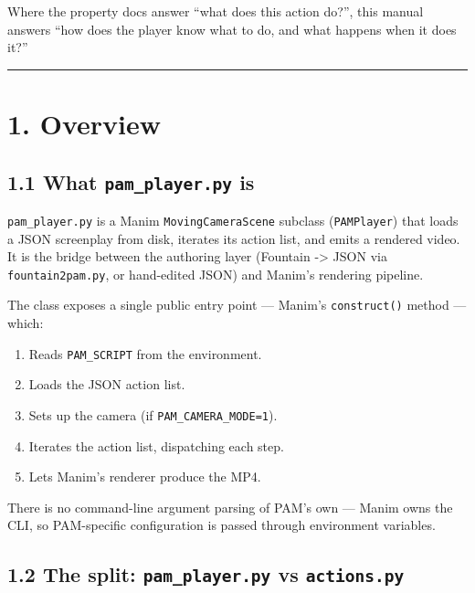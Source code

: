 \documentclass[
  12pt,
  letterpaper,
]{book}
\providecommand{\tightlist}{%
  \setlength{\itemsep}{0pt}\setlength{\parskip}{0pt}}
\begin{document}
Where the property docs answer ``what does this action do?'', this
manual answers ``how does the player know what to do, and what happens
when it does it?''

\begin{center}\rule{0.5\linewidth}{0.5pt}\end{center}

\section{1. Overview}\label{overview}

\subsection{\texorpdfstring{1.1 What \texttt{pam\_player.py}
is}{1.1 What pam\_player.py is}}\label{what-pam_player.py-is}

\texttt{pam\_player.py} is a Manim \texttt{MovingCameraScene} subclass
(\texttt{PAMPlayer}) that loads a JSON screenplay from disk, iterates
its action list, and emits a rendered video. It is the bridge between
the authoring layer (Fountain -\textgreater{} JSON via
\texttt{fountain2pam.py}, or hand-edited JSON) and Manim's rendering
pipeline.

The class exposes a single public entry point --- Manim's
\texttt{construct()} method --- which:

\begin{enumerate}
\def\labelenumi{\arabic{enumi}.}
\tightlist
\item
  Reads \texttt{PAM\_SCRIPT} from the environment.
\item
  Loads the JSON action list.
\item
  Sets up the camera (if \texttt{PAM\_CAMERA\_MODE=1}).
\item
  Iterates the action list, dispatching each step.
\item
  Lets Manim's renderer produce the MP4.
\end{enumerate}

There is no command-line argument parsing of PAM's own --- Manim owns
the CLI, so PAM-specific configuration is passed through environment
variables.

\subsection{\texorpdfstring{1.2 The split: \texttt{pam\_player.py} vs
\texttt{actions.py}}{1.2 The split: pam\_player.py vs actions.py}}\label{the-split-pam_player.py-vs-actions.py}
\end{document}
